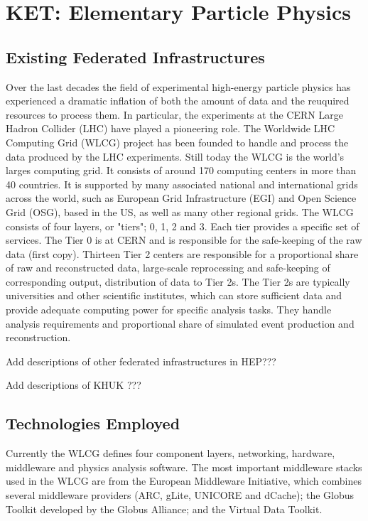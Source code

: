 \section{KET: Elementary Particle Physics}


\subsection{Existing Federated Infrastructures}
Over the last decades the field of experimental high-energy particle
physics has experienced a dramatic inflation of both the amount of
data and the reuquired resources to process them. In particular, the
experiments at the CERN Large Hadron Collider (LHC) have played a
pioneering role. The Worldwide LHC Computing Grid (WLCG) project has
been founded to handle and process the data produced by the LHC
experiments. Still today  the WLCG is the world's larges computing
grid. It consists of around 170 computing centers in more than 40
countries.  It is supported by many associated national and
international grids across the world, such as European Grid
Infrastructure (EGI) and Open Science Grid (OSG), based in the US, as well as many other
regional grids.  The WLCG consists of four layers, or "tiers"; 0, 1, 2
and 3. Each tier provides a specific set of services. The Tier 0 is at
CERN and is responsible for the safe-keeping of the raw data (first
copy). Thirteen Tier 2 centers are responsible for a proportional
share of raw and reconstructed data, large-scale reprocessing and
safe-keeping of corresponding output, distribution of data to Tier
2s. The Tier 2s are typically universities and other scientific
institutes, which can store sufficient data and provide adequate
computing power for specific analysis tasks. They handle analysis
requirements and proportional share of simulated event production and
reconstruction.

Add descriptions of other federated infrastructures in HEP???

Add descriptions of KHUK ???


\subsection{Technologies Employed}
Currently the WLCG defines four component layers,  networking, hardware, middleware and
physics analysis software. The most important middleware stacks used
in the WLCG are from the European Middleware Initiative, which
combines several middleware providers (ARC, gLite, UNICORE and
dCache); the Globus Toolkit developed by the Globus Alliance; and the
Virtual Data Toolkit. 



